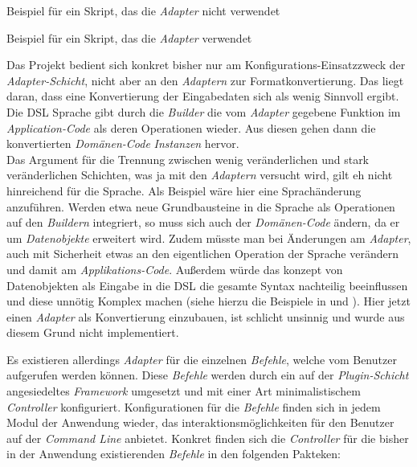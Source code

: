 \vspace{5mm}
\begin{listing}[h]

    \caption{Beispiel für ein Skript, das die \emph{Adapter} nicht verwendet}
    \label{lst:noadapter}
\end{listing}
\vspace{5mm}

\begin{listing}[h]
        
    \caption{Beispiel für ein Skript, das die \emph{Adapter} verwendet}
    \label{lst:adapter}
\end{listing}
\vspace{5mm}

Das Projekt bedient sich konkret bisher nur am Konfigurations-Einsatzzweck der \emph{Adapter-Schicht}, nicht aber an den \emph{Adaptern} zur Formatkonvertierung.
Das liegt daran, dass eine Konvertierung der Eingabedaten sich als wenig Sinnvoll ergibt.
Die DSL Sprache gibt durch die \emph{Builder} die vom \emph{Adapter} gegebene Funktion im \emph{Application-Code} als deren Operationen wieder.
Aus diesen gehen dann die konvertierten \emph{Domänen-Code} \emph{Instanzen} hervor.\\
Das Argument für die Trennung zwischen wenig veränderlichen und stark veränderlichen Schichten, was ja mit den \emph{Adaptern} versucht wird, gilt eh nicht hinreichend für die Sprache. 
Als Beispiel wäre hier eine Sprachänderung anzuführen.
Werden etwa neue Grundbausteine in die Sprache als Operationen auf den \emph{Buildern} integriert, so muss sich auch der \emph{Domänen-Code} ändern, da er um \emph{Datenobjekte} erweitert wird.
Zudem müsste man bei Änderungen am \emph{Adapter}, auch mit Sicherheit etwas an den eigentlichen Operation der Sprache verändern und damit am \emph{Applikations-Code}.
Außerdem würde das konzept von Datenobjekten als Eingabe in die DSL die gesamte Syntax nachteilig beeinflussen und diese unnötig Komplex machen (siehe hierzu die Beispiele in  und ).
Hier jetzt einen \emph{Adapter} als Konvertierung einzubauen, ist schlicht unsinnig und wurde aus diesem Grund nicht implementiert.

Es existieren allerdings \emph{Adapter} für die einzelnen \emph{Befehle}, welche vom Benutzer aufgerufen werden können.
Diese \emph{Befehle} werden durch ein auf der \emph{Plugin-Schicht} angesiedeltes \emph{Framework} umgesetzt und mit einer Art minimalistischem \emph{Controller} konfiguriert.
Konfigurationen für die \emph{Befehle} finden sich in jedem Modul der Anwendung wieder, das interaktionsmöglichkeiten für den Benutzer auf der \emph{Command Line} anbietet.
Konkret finden sich die \emph{Controller} für die bisher in der Anwendung existierenden \emph{Befehle} in den folgenden Pakteken:

